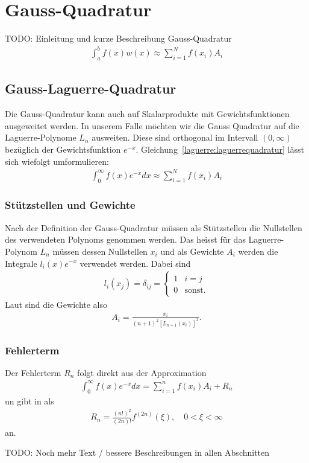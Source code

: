 %
%
%
\section{Gauss-Quadratur
  \label{laguerre:section:quadratur}}
 {\large \color{red} TODO: Einleitung und kurze Beschreibung Gauss-Quadratur}
\begin{align}
\int_a^b f(x) w(x)
\approx
\sum_{i=1}^N f(x_i) A_i
\label{laguerre:gaussquadratur}
\end{align}

\subsection{Gauss-Laguerre-Quadratur
\label{laguerre:subsection:gausslag-quadratur}}
Die Gauss-Quadratur kann auch auf Skalarprodukte mit Gewichtsfunktionen
ausgeweitet werden.
In unserem Falle möchten wir die Gauss Quadratur auf die Laguerre-Polynome
$L_n$ ausweiten.
Diese sind orthogonal im Intervall $(0, \infty)$ bezüglich
der Gewichtsfunktion $e^{-x}$.
Gleichung~\eqref{laguerre:laguerrequadratur} lässt sich wiefolgt umformulieren:
\begin{align}
\int_{0}^{\infty} f(x) e^{-x} dx
\approx
\sum_{i=1}^{N} f(x_i) A_i
\label{laguerre:laguerrequadratur}
\end{align}

\subsubsection{Stützstellen und Gewichte}
Nach der Definition der Gauss-Quadratur müssen als Stützstellen die Nullstellen
des verwendeten Polynoms genommen werden.
Das heisst für das Laguerre-Polynom $L_n$ müssen dessen Nullstellen $x_i$ und
als Gewichte $A_i$ werden die Integrale $l_i(x)e^{-x}$ verwendet werden.
Dabei sind
\begin{align*}
l_i(x_j)
=
\delta_{ij}
=
\begin{cases}
1 & i=j           \\
0 & \text{sonst.}
\end{cases}
\end{align*}
Laut \cite{abramowitz+stegun} sind die Gewichte also
\begin{align}
A_i
=
\frac{x_i}{(n + 1)^2 \left[ L_{n + 1}(x_i)\right]^2}
.
\label{laguerre:quadratur_gewichte}
\end{align}

\subsubsection{Fehlerterm}
Der Fehlerterm $R_n$ folgt direkt aus der Approximation
\begin{align*}
\int_0^{\infty} f(x) e^{-x} dx
=
\sum_{i=1}^n f(x_i) A_i + R_n
\end{align*}
un \cite{abramowitz+stegun} gibt in als
\begin{align}
R_n
=
\frac{(n!)^2}{(2n)!} f^{(2n)}(\xi)
,\quad
0 < \xi < \infty
\label{lagurre:lag_error}
\end{align}
an.

{
\large \color{red}
TODO:
Noch mehr Text / bessere Beschreibungen in allen Abschnitten
}
